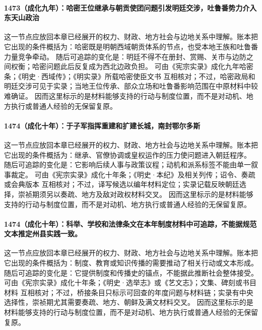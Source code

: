 \paragraph{1473（成化九年）：哈密王位继承与朝贡使团问题引发明廷交涉，吐鲁番势力介入东天山政治} 这一节点应放回本章已经展开的权力、财政、地方社会与边地关系中理解。账本把它出现的条件概括为：哈密既是明朝西域朝贡体系的节点，也受本地王族和吐鲁番力量竞争牵动。 随后可追踪的变化是：明廷不得不在册封、赏赐、关市与边防之间权衡；哈密问题此后反复成为西北边政负担。 可由《宪宗实录》成化九年哈密条；《明史·西域传》；《明实录》所载哈密使臣文书 互相核对；不过，哈密政局和明廷交涉可见于实录；当地王位传承、部众立场和吐鲁番影响范围在中原材料中较难确证。 因而这里标示的是材料能够支持的行动与制度位置，而不是对动机、地方执行或普通人经验的无保留复原。

\paragraph{1474（成化十年）：于子军指挥重建和扩建长城，南封鄂尔多斯} 这一节点应放回本章已经展开的权力、财政、地方社会与边地关系中理解。账本把它出现的条件概括为：继承、官僚协调或皇权运作的压力使问题进入朝廷程序。 随后可追踪的变化是：它影响后续人事与政策议程；动机和派系标签不能由单一叙事裁定。 可由《宪宗实录》成化十年条；《明史·本纪》及相关列传；诏令、奏疏或会典版本 互相核对；不过，译写候选以编年材料定位；实录记载反映朝廷选择，崇祯期须另以奏疏、地方及敌对政权材料交叉。 因而这里标示的是材料能够支持的行动与制度位置，而不是对动机、地方执行或普通人经验的无保留复原。

\paragraph{1474（成化十年）：科举、学校和法律条文在本年制度材料中可追踪，不能据规范文本推定州县实践一致。} 这一节点应放回本章已经展开的权力、财政、地方社会与边地关系中理解。账本把它出现的条件概括为：制度、教育或知识传播的需要推动了相关行动或文本形成。 随后可追踪的变化是：它提供制度和传播史的锚点，不能据此推断社会整体接受。 可由《宪宗实录》成化十年条；《明史·选举志》或《艺文志》；文集、碑刻或书目材料 互相核对；不过，桥接条目只标示可回查的年度问题与材料链；实录有中央选择性，崇祯期尤其需要奏疏、地方、朝鲜及满文材料交叉。 因而这里标示的是材料能够支持的行动与制度位置，而不是对动机、地方执行或普通人经验的无保留复原。


